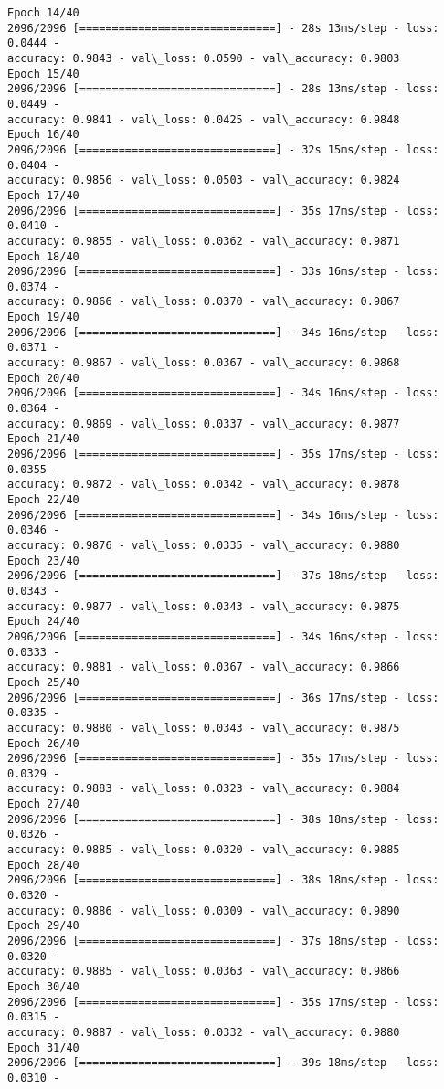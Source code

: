 \documentclass[11pt]{article}
\begin{document}
\begin{Verbatim}[commandchars=\\\{\}]
Epoch 14/40
2096/2096 [==============================] - 28s 13ms/step - loss: 0.0444 -
accuracy: 0.9843 - val\_loss: 0.0590 - val\_accuracy: 0.9803
Epoch 15/40
2096/2096 [==============================] - 28s 13ms/step - loss: 0.0449 -
accuracy: 0.9841 - val\_loss: 0.0425 - val\_accuracy: 0.9848
Epoch 16/40
2096/2096 [==============================] - 32s 15ms/step - loss: 0.0404 -
accuracy: 0.9856 - val\_loss: 0.0503 - val\_accuracy: 0.9824
Epoch 17/40
2096/2096 [==============================] - 35s 17ms/step - loss: 0.0410 -
accuracy: 0.9855 - val\_loss: 0.0362 - val\_accuracy: 0.9871
Epoch 18/40
2096/2096 [==============================] - 33s 16ms/step - loss: 0.0374 -
accuracy: 0.9866 - val\_loss: 0.0370 - val\_accuracy: 0.9867
Epoch 19/40
2096/2096 [==============================] - 34s 16ms/step - loss: 0.0371 -
accuracy: 0.9867 - val\_loss: 0.0367 - val\_accuracy: 0.9868
Epoch 20/40
2096/2096 [==============================] - 34s 16ms/step - loss: 0.0364 -
accuracy: 0.9869 - val\_loss: 0.0337 - val\_accuracy: 0.9877
Epoch 21/40
2096/2096 [==============================] - 35s 17ms/step - loss: 0.0355 -
accuracy: 0.9872 - val\_loss: 0.0342 - val\_accuracy: 0.9878
Epoch 22/40
2096/2096 [==============================] - 34s 16ms/step - loss: 0.0346 -
accuracy: 0.9876 - val\_loss: 0.0335 - val\_accuracy: 0.9880
Epoch 23/40
2096/2096 [==============================] - 37s 18ms/step - loss: 0.0343 -
accuracy: 0.9877 - val\_loss: 0.0343 - val\_accuracy: 0.9875
Epoch 24/40
2096/2096 [==============================] - 34s 16ms/step - loss: 0.0333 -
accuracy: 0.9881 - val\_loss: 0.0367 - val\_accuracy: 0.9866
Epoch 25/40
2096/2096 [==============================] - 36s 17ms/step - loss: 0.0335 -
accuracy: 0.9880 - val\_loss: 0.0343 - val\_accuracy: 0.9875
Epoch 26/40
2096/2096 [==============================] - 35s 17ms/step - loss: 0.0329 -
accuracy: 0.9883 - val\_loss: 0.0323 - val\_accuracy: 0.9884
Epoch 27/40
2096/2096 [==============================] - 38s 18ms/step - loss: 0.0326 -
accuracy: 0.9885 - val\_loss: 0.0320 - val\_accuracy: 0.9885
Epoch 28/40
2096/2096 [==============================] - 38s 18ms/step - loss: 0.0320 -
accuracy: 0.9886 - val\_loss: 0.0309 - val\_accuracy: 0.9890
Epoch 29/40
2096/2096 [==============================] - 37s 18ms/step - loss: 0.0320 -
accuracy: 0.9885 - val\_loss: 0.0363 - val\_accuracy: 0.9866
Epoch 30/40
2096/2096 [==============================] - 35s 17ms/step - loss: 0.0315 -
accuracy: 0.9887 - val\_loss: 0.0332 - val\_accuracy: 0.9880
Epoch 31/40
2096/2096 [==============================] - 39s 18ms/step - loss: 0.0310 -

\end{Verbatim}
\end{document}
